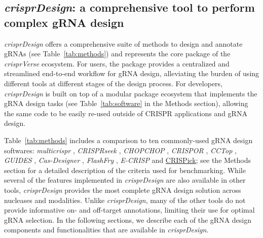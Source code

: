 \documentclass[pdftex,english,10pt]{article}
\begin{document}
\subsection{\textit{crisprDesign}: a comprehensive tool to perform complex gRNA design}


\textit{crisprDesign} offers a comprehensive suite of methods to design and annotate gRNAs (see Table~\ref{tab:methods}) and represents the core package of the \textit{crisprVerse} ecosystem. For users, the package provides a centralized and streamlined end-to-end workflow for gRNA design, alleviating the burden of using different tools at different stages of the design process. For developers, \textit{crisprDesign} is built on top of a modular package ecosystem that implements the gRNA design tasks (see Table~\ref{tab:software} in the Methods section), allowing the same code to be easily re-used outside of CRISPR applications and gRNA design. 

Table~\ref{tab:methods} includes a comparison to ten commonly-used gRNA design softwares: \textit{multicrispr} \citep{multicrispr}, \textit{CRISPRseek} \citep{crisprseek}, \textit{CHOPCHOP} \citep{chopchop},  \textit{CRISPOR} \citep{crispor},  \textit{CCTop} \citep{cctop}, \textit{GUIDES} \citep{guides}, \textit{Cas-Designer} \citep{casdesigner}, \textit{FlashFry} \citep{flashfry}, \textit{E-CRISP} \citep{ecrisp} and \href{https://portals.broadinstitute.org/gppx/crispick/public}{CRISPick}; see the Methods section for a detailed description of the criteria used for benchmarking. While several of the features implemented in \textit{crisprDesign} are also available in other tools, \textit{crisprDesign} provides the most complete gRNA design solution across nucleases and modalities. Unlike \textit{crisprDesign}, many of the other tools do not provide informative on- and off-target annotations, limiting their use for optimal gRNA selection. In the following sections, we describe each of the gRNA design components and functionalities that are available in \textit{crisprDesign}.
\end{document}
